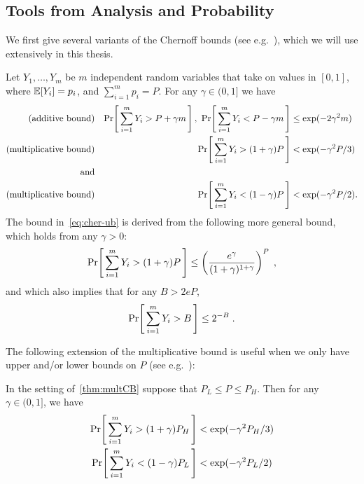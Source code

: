 \subsection{Tools from Analysis and Probability}
We first give several variants of the Chernoff bounds (see e.g.~\cite[Chapter~4]{MotwaniRaghavan:95}), which we will use extensively in this thesis.
\begin{theorem} \label{thm:multCB}
Let $Y_1,\dots,Y_m$ be $m$ independent random variables that take on values in $[0,1]$, where $\mathbb{E}\!\left[Y_i\right] = p_i$, and $\sum_{i=1}^m p_i = P$. For any $\gamma \in (0,1]$ we have
\begin{align}
  \label{eq:additive-chernoff}\text{(additive bound)} & & \Pr\!\left[\,  \sum_{i=1}^m Y_i   > P+ \gamma m  \, \right],\ \Pr\!\left[\,  \sum_{i=1}^m Y_i  < P - \gamma m \, \right] &\leq \exp(-2 \gamma^2 m)\\
  \label{eq:cher-ub}\text{(multiplicative bound)}     & & \Pr\!\left[\,  \sum_{i=1}^m Y_i > (1+\gamma)P \, \right] &< \exp(-\gamma^2 P/3)\\
  \text{and}\notag\\
  \label{eq:cher-lb}\text{(multiplicative bound)}     & & \Pr\!\left[\,  \sum_{i=1}^m Y_i < (1-\gamma)P \, \right] &< \exp(-\gamma^2 P/2).
\end{align}
The bound in~\cref{eq:cher-ub} is derived from the following more general bound, which holds from any $\gamma > 0$:
  \begin{equation}\label{eq:cher-ub-gen}
  \Pr\!\left[\,  \sum_{i=1}^m Y_i > (1+\gamma)P \, \right] \leq \left(\frac{e^\gamma}{(1+\gamma)^{1+\gamma}}\right)^{P}\;,
  \end{equation}
and which also implies that for any $B > 2eP$,
  \begin{equation}\label{eq:cher-ub-large}
  \Pr\!\left[\,  \sum_{i=1}^m Y_i > B \, \right] \leq 2^{-B}\;.
  \end{equation}
\end{theorem}
The following extension of the multiplicative bound is useful when we only have upper and/or lower bounds on $P$ (see e.g.~\cite[Exercise~1.1]{DP:09}):
\begin{claim} \label{cor:CB-upperlower}
In the setting of~\cref{thm:multCB} suppose that $P_L \leq P \leq P_H.$ Then for any $\gamma \in (0,1]$, we have
  \begin{align}
    \Pr\!\left[\,  \sum_{i=1}^m Y_i > (1+\gamma)P_H \, \right] &< \exp(-\gamma^2 P_H/3)      \label{eq:multCB-upper2}\\
    \Pr\!\left[\,  \sum_{i=1}^m Y_i < (1-\gamma)P_L \, \right] &< \exp(-\gamma^2 P_L/2)      \label{eq:multCB-lower}
  \end{align}
\end{claim}

